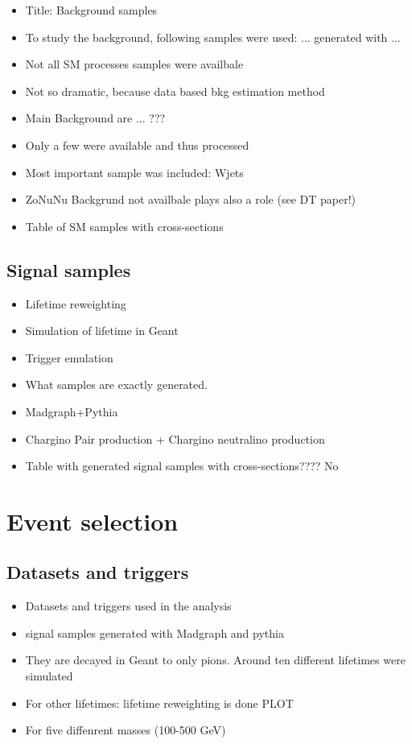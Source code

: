 \begin{itemize}
\item Title: Background samples
\item To study the background, following samples were used: ... generated with ...
\item Not all SM processes samples were availbale
\item Not so dramatic, because data based bkg estimation method
\item Main Background are ... ???
\item Only a few were available and thus processed
\item Most important sample was included: Wjets
\item ZoNuNu Backgrund not availbale plays also a role (see DT paper!)
\item Table of SM samples with cross-sections
\end{itemize}

\subsection{Signal samples}
\label{sec:SignalSamples}
\begin{itemize}
\item Lifetime reweighting
\item Simulation of lifetime in Geant
\item Trigger emulation
\item What samples are exactly generated.
\item Madgraph+Pythia
\item Chargino Pair production + Chargino neutralino production
\item Table with generated signal samples with cross-sections???? No
\end{itemize}

\section{Event selection}
\label{sec:EventSelection}
\subsection{Datasets and triggers}
\begin{itemize}
\item Datasets and triggers used in the analysis
\item signal samples generated with Madgraph and pythia
\item They are decayed in Geant to only pions. Around ten different lifetimes were simulated
\item For other lifetimes: lifetime reweighting is done PLOT
\item For five diffenrent masses (100-500 GeV) 
\end{itemize}
